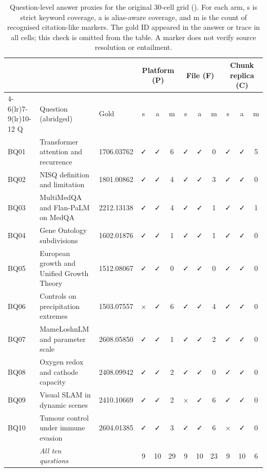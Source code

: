 \documentclass[11pt]{article}
\begin{document}
\begin{table}
\centering
\small
\setlength{\tabcolsep}{3pt}
\caption{Question-level answer proxies for the original 30-cell grid
(). For each arm, s is strict
keyword coverage, a is alias-aware coverage, and m is the count of
recognised citation-like markers. The gold ID appeared in the answer or
trace in all cells; this check is omitted from the table. A marker does not
verify source resolution or entailment.}

\begin{tabular}{@{}lp{4cm}l*{9}{c}@{}}
\toprule
 & & & \multicolumn{3}{c}{Platform (P)} & \multicolumn{3}{c}{File (F)} & \multicolumn{3}{c}{Chunk replica (C)}\\
\cmidrule(lr){4-6}\cmidrule(lr){7-9}\cmidrule(lr){10-12}
Q & Question (abridged) & Gold & s & a & m & s & a & m & s & a & m\\
\midrule
BQ01 & Transformer attention and recurrence & 1706.03762 & ✓ & ✓ & 6 & ✓ & ✓ & 0 & ✓ & ✓ & 5\\
BQ02 & NISQ definition and limitation & 1801.00862 & ✓ & ✓ & 4 & ✓ & ✓ & 3 & ✓ & ✓ & 0\\
BQ03 & MultiMedQA and Flan-PaLM on MedQA & 2212.13138 & ✓ & ✓ & 4 & ✓ & ✓ & 1 & ✓ & ✓ & 1\\
BQ04 & Gene Ontology subdivisions & 1602.01876 & ✓ & ✓ & 1 & ✓ & ✓ & 1 & ✓ & ✓ & 0\\
BQ05 & European growth and Unified Growth Theory & 1512.08067 & ✓ & ✓ & 0 & ✓ & ✓ & 0 & ✓ & ✓ & 0\\
BQ06 & Controls on precipitation extremes & 1503.07557 & $\times$ & ✓ & 6 & ✓ & ✓ & 4 & ✓ & ✓ & 0\\
BQ07 & MameLoshnLM and parameter scale & 2608.05850 & ✓ & ✓ & 1 & ✓ & ✓ & 2 & ✓ & ✓ & 0\\
BQ08 & Oxygen redox and cathode capacity & 2408.09942 & ✓ & ✓ & 2 & ✓ & ✓ & 0 & ✓ & ✓ & 0\\
BQ09 & Visual SLAM in dynamic scenes & 2410.10669 & ✓ & ✓ & 2 & $\times$ & ✓ & 6 & ✓ & ✓ & 0\\
BQ10 & Tumour control under immune evasion & 2604.01385 & ✓ & ✓ & 3 & ✓ & ✓ & 6 & $\times$ & ✓ & 0\\
\midrule
 & \emph{All ten questions} & & 9 & 10 & 29 & 9 & 10 & 23 & 9 & 10 & 6\\
\bottomrule
\end{tabular}
\end{table}
\end{document}
